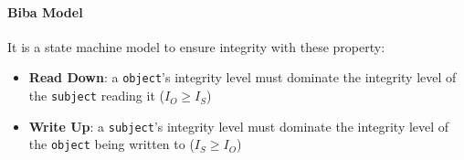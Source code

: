 \paragraph{Biba Model}
It is a state machine model to ensure integrity with these property:
\begin{itemize}
    \item \textbf{Read Down}: a \texttt{object}'s integrity level must dominate the integrity level of the \texttt{subject} reading it ($I_O \geq I_S$)
    \item \textbf{Write Up}: a \texttt{subject}'s integrity level must dominate the integrity level of the \texttt{object} being written to ($I_S \geq I_O$)
\end{itemize}